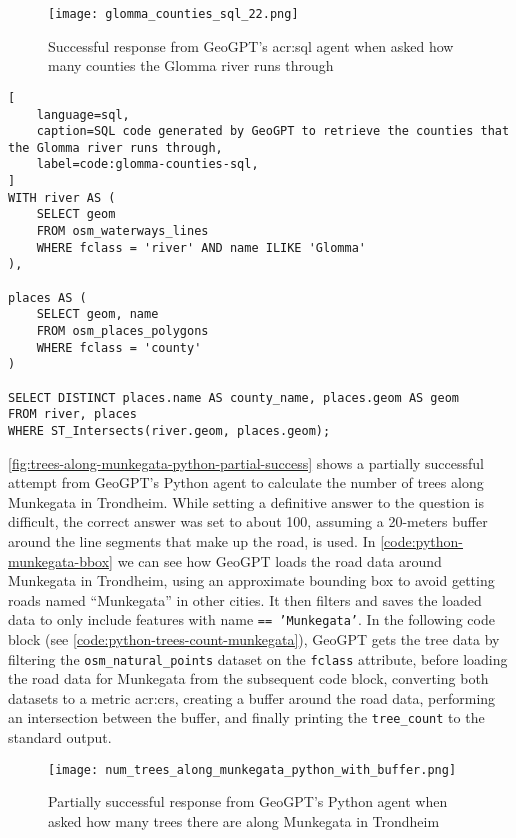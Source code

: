 \begin{figure}[htbp]
    \centering
    \texttt{[image: glomma\_counties\_sql\_22.png]}
    \caption{Successful response from GeoGPT's \acrshort{acr:sql} agent when asked how many counties the Glomma river runs through}
    \label{fig:glomma-counties-sql-successful}
\end{figure}

\FloatBarrier

\begin{lstlisting}[
    language=sql,
    caption=SQL code generated by GeoGPT to retrieve the counties that the Glomma river runs through,
    label=code:glomma-counties-sql,
]
WITH river AS (
    SELECT geom 
    FROM osm_waterways_lines 
    WHERE fclass = 'river' AND name ILIKE 'Glomma'
),

places AS (
    SELECT geom, name 
    FROM osm_places_polygons 
    WHERE fclass = 'county'
)

SELECT DISTINCT places.name AS county_name, places.geom AS geom
FROM river, places
WHERE ST_Intersects(river.geom, places.geom);    
\end{lstlisting}

\FloatBarrier

\autoref{fig:trees-along-munkegata-python-partial-success} shows a partially successful attempt from GeoGPT's Python agent to calculate the number of trees along Munkegata in Trondheim. While setting a definitive answer to the question is difficult, the correct answer was set to about 100, assuming a 20-meters buffer around the line segments that make up the road, is used. In \autoref{code:python-munkegata-bbox} we can see how GeoGPT loads the road data around Munkegata in Trondheim, using an approximate bounding box to avoid getting roads named \enquote{Munkegata} in other cities. It then filters and saves the loaded data to only include features with name \texttt{== 'Munkegata'}. In the following code block (see \autoref{code:python-trees-count-munkegata}), GeoGPT gets the tree data by filtering the \texttt{osm\_natural\_points} dataset on the \texttt{fclass} attribute, before loading the road data for Munkegata from the subsequent code block, converting both datasets to a metric \acrshort{acr:crs}, creating a buffer around the road data, performing an intersection between the buffer, and finally printing the \texttt{tree\_count} to the standard output.

\begin{figure}[htbp]
    \centering
    \texttt{[image: num\_trees\_along\_munkegata\_python\_with\_buffer.png]}
    \caption{Partially successful response from GeoGPT's Python agent when asked how many trees there are along Munkegata in Trondheim}
    \label{fig:trees-along-munkegata-python-partial-success}
\end{figure}


